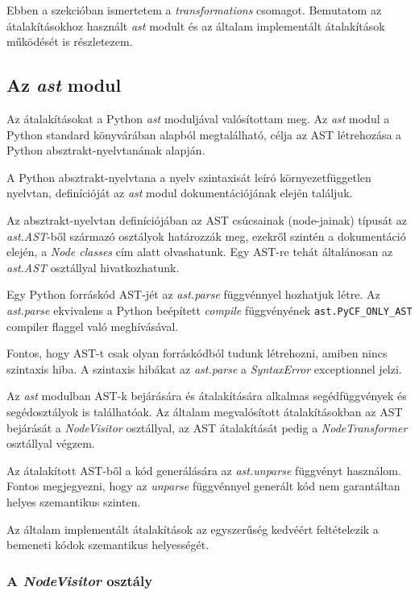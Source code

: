 Ebben a szekcióban ismertetem a \emph{transformations} csomagot.
Bemutatom az átalakításokhoz használt \emph{ast} modult és
az általam implementált átalakítások működését is részletezem.

\subsection{Az \emph{ast} modul}

Az átalakításokat a Python \emph{ast} moduljával valósítottam meg.
Az \emph{ast} modul a Python standard könyvárában alapból megtalálható, 
célja az AST létrehozása a Python absztrakt-nyelvtanának alapján.

A Python absztrakt-nyelvtana a nyelv szintaxisát leíró környezetfüggetlen nyelvtan,
definícióját az \emph{ast} modul dokumentációjának \cite{pythonAST} elején találjuk.

Az absztrakt-nyelvtan definíciójában az AST csúcsainak (node-jainak) típusát az
\emph{ast.AST}-ből származó osztályok határozzák meg,
ezekről szintén a dokumentáció elején, a \emph{Node classes} cím alatt olvashatunk.
Egy AST-re tehát általánosan az \emph{ast.AST} osztállyal hivatkozhatunk.

Egy Python forráskód AST-jét az \emph{ast.parse} függvénnyel hozhatjuk létre.
Az \emph{ast.parse} ekvivalens a Python beépített
\emph{compile} függvényének \texttt{ast.PyCF\_ONLY\_AST} compiler flaggel való
meghívásával.

Fontos, hogy AST-t csak olyan forráskódból tudunk létrehozni, amiben nincs
szintaxis hiba.
A szintaxis hibákat az \emph{ast.parse} a \emph{SyntaxError} exceptionnel jelzi.

Az \emph{ast} modulban AST-k bejárására és átalakítására alkalmas
segédfüggvények és segédosztályok is találhatóak.
Az általam megvalósított átalakításokban
az AST bejárását a \emph{NodeVisitor} osztállyal,
az AST átalakítását pedig a \emph{NodeTransformer} osztállyal
végzem.

Az átalakított AST-ből a kód generálására az \emph{ast.unparse} függvényt használom.
Fontos megjegyezni, hogy az \emph{unparse} függvénnyel generált kód nem garantáltan
helyes szemantikus szinten.

Az általam implementált átalakítások az egyszerűség kedvéért feltételezik a bemeneti
kódok szemantikus helyességét.


\subsubsection{A \emph{NodeVisitor} osztály}

